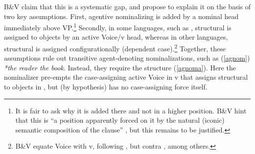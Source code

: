 \documentclass[output=paper,
modfonts
]{LSP/langsci}
\newcommand{\rf}[1]{(\ref{#1})}
\begin{document}
B\&V claim that this is a systematic gap, and propose to explain it on the basis of two key
assumptions.  First, agentive nominalizing  is added by a nominal head immediately
above VP.\footnote{It is fair to ask why it is added there and not in a higher position.  B\&V
  hint that this is ``a position apparently forced on it by the natural (iconic) semantic
  composition of the clause'' \citep[521]{baker2009}, but this remains to be justified.} Secondly, in some
languages, such as , structural  is assigned to objects by an active Voice/v head,
whereas in other languages, structural  is assigned configurationally (dependent
case).\footnote{B\&V equate Voice with v, following \citet{kratzer2004}, but contra \citet{alexiadou2001,alexiadou2010,harley2012}, among others.} Together, these assumptions rule out transitive
agent-denoting nominalizations, such as \rf{agnom} \textit{*the reader the book}. Instead, they
require the structure \rf{agnoma}.  Here the  nominalizer pre-empts the case-assigning
active Voice  in v that assigns structural  to objects in , but (by
hypothesis) has no case-assigning force itself.
\end{document}
